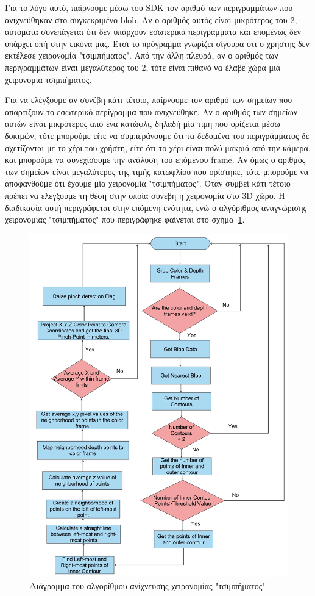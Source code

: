 Για το λόγο αυτό, παίρνουμε μέσω του SDK τον αριθμό των περιγραμμάτων που ανιχνεύθηκαν στο συγκεκριμένο blob. Αν ο αριθμός αυτός είναι μικρότερος του 2, αυτόματα συνεπάγεται ότι δεν υπάρχουν εσωτερικά περιγράμματα και επομένως δεν υπάρχει οπή στην εικόνα μας. Έτσι το πρόγραμμα γνωρίζει σίγουρα ότι ο χρήστης δεν εκτέλεσε χειρονομία "τσιμπήματος". Από την άλλη πλευρά, αν ο αριθμός των περιγραμμάτων είναι μεγαλύτερος του 2, τότε είναι πιθανό να έλαβε χώρα μια χειρονομία τσιμπήματος. 


Για να ελέγξουμε αν συνέβη κάτι τέτοιο, παίρνουμε τον αριθμό των σημείων που απαρτίζουν το εσωτερικό περίγραμμα που ανιχνεύθηκε. Αν ο αριθμός των σημείων αυτών είναι μικρότερος από ένα κατώφλι, δηλαδή μία τιμή που ορίζεται μέσω δοκιμών, τότε μπορούμε είτε να συμπεράνουμε ότι τα δεδομένα του περιγράμματος δε σχετίζονται με το χέρι του χρήστη, είτε ότι το χέρι είναι πολύ μακριά από την κάμερα, και μπορούμε να συνεχίσουμε την ανάλυση του επόμενου frame. Αν όμως ο αριθμός των σημείων είναι μεγαλύτερος της τιμής κατωφλίου που ορίστηκε, τότε μπορούμε να αποφανθούμε ότι έχουμε μία χειρονομία "τσιμπήματος". Όταν συμβεί κάτι τέτοιο πρέπει να ελέγξουμε τη θέση στην οποία συνέβη η χειρονομία στο 3D χώρο. Η διαδικασία αυτή περιγράφεται στην επόμενη ενότητα, ενώ ο αλγόριθμος αναγνώρισης χειρονομίας "τσιμπήματος" που περιγράφηκε φαίνεται στο σχήμα~\ref{fig:gesture_rec}.







\begin{figure}[H]
    \centering
    \includegraphics[width=.85\linewidth]{Files/Figures/pinch_gesture_detection.png}
    \caption[Διάγραμμα του αλγορίθμου ανίχνευσης χειρονομίας "τσιμπήματος"]{Διάγραμμα του αλγορίθμου ανίχνευσης χειρονομίας "τσιμπήματος"}
    \label{fig:gesture_rec}
\end{figure}



